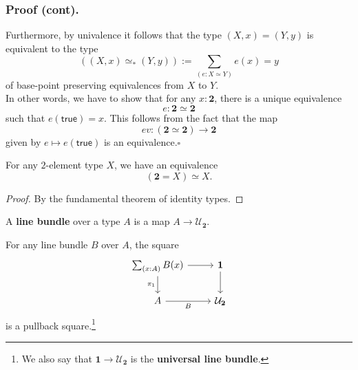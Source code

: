 \documentclass[handout]{beamer}
\newcommand{\UU}{\mathcal{U}}
\newcommand{\unit}{\mathbf{1}}
\newcommand{\bool}{\mathbf{2}}
\newcommand{\btrue}{\mathsf{true}}
\begin{document}
\begin{frame}
  \frametitle{Proof (cont).}
  Furthermore, by univalence it follows that the type $(X,x)=(Y,y)$ is equivalent to the type
  \begin{equation*}
    ((X,x)\simeq_\ast(Y,y)):=\sum_{(e:X\simeq Y)}e(x)=y
  \end{equation*}
  of base-point preserving equivalences from $X$ to $Y$.\\[\baselineskip]

  In other words, we have to show that for any $x:\bool$, there is a unique equivalence
  \begin{equation*}
    e:\bool\simeq\bool
  \end{equation*}
  such that $e(\btrue)=x$. This follows from the fact that the map
  \begin{equation*}
    ev:(\bool\simeq\bool)\to\bool
  \end{equation*}
  given by $e\mapsto e(\btrue)$ is an equivalence.\hfill$\square$
\end{frame}

\begin{frame}
  \begin{corollary}
    For any $2$-element type $X$, we have an equivalence
    \begin{equation*}
      (\bool=X)\simeq X.
    \end{equation*}
  \end{corollary}
  \begin{proof}
    By the fundamental theorem of identity types.
  \end{proof}
\end{frame}

\begin{frame}
  \begin{definition}
    A \textbf{line bundle} over a type $A$ is a map $A\to\UU_\bool$. 
  \end{definition}
  \begin{corollary}
    For any line bundle $B$ over $A$, the square
    \begin{equation*}
      \begin{tikzcd}[ampersand replacement=\&]
        \sum_{(x:A)}B(x) \arrow[d,swap,"\pi_1"] \arrow[r] \& \unit \arrow[d] \\
        A \arrow[r,swap,"B"] \& \UU_{\bool}
      \end{tikzcd}
    \end{equation*}
    is a pullback square.\footnote{We also say that $\unit\to\UU_{\bool}$ is the \textbf{universal line bundle}.}
  \end{corollary}
\end{frame}
\end{document}
